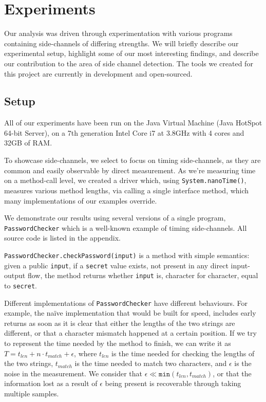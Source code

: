 \section{Experiments}

Our analysis was driven through experimentation with various programs containing side-channels of differing strengths. We will briefly describe our experimental setup, highlight some of our most interesting findings, and describe our contribution to the area of side channel detection. The tools we created for this
project are currently in development and open-sourced. 


\subsection{Setup}

All of our experiments have been run on the Java Virtual Machine (Java HotSpot 
64-bit Server), on a 7th generation Intel Core i7 at 3.8GHz with 4 cores and 32GB of RAM.

To showcase side-channels, we select to focus on timing side-channels, as they are common
and easily observable by direct measurement. As we're measuring time on a method-call level, 
we created a driver which, using \texttt{System.nanoTime()}, measures various method lengths,
via calling a single interface method, which many implementations of our examples override. 

We demonstrate our results using several versions of a single program, \texttt{PasswordChecker}
which is a well-known example of timing side-channels. All source code is listed in the appendix.

\texttt{PasswordChecker.checkPassword(input)} is a method with simple semantics: given a public 
\texttt{input}, if a \texttt{secret} value exists, not present in any direct input-output flow, the 
method returns whether \texttt{input} is, character for character, equal to \texttt{secret}.

Different implementations of \texttt{PasswordChecker} have different behaviours. For example,
the na\"ive implementation that would be built for speed, includes early returns as soon as
it is clear that either the lengths of the two strings are different, or that a character
mismatch happened at a certain position. If we try to represent the time needed by the method
to finish, we can write it as $T = t_{len} + n\cdot t_{match} + \epsilon$, where $t_{len}$ is the time needed for
checking the lengths of the two strings, $t_{match}$ is the time needed to match two characters, and $\epsilon$ is the noise in the measurement. We consider that $\epsilon \ll \texttt{min}(t_{len}, t_{match})$, or that the information lost as a result of $\epsilon$ being present is recoverable through taking multiple samples.

